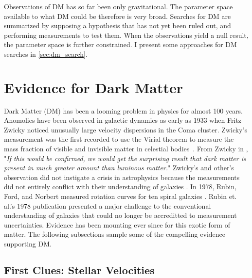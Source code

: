 Observations of DM has so far been only gravitational.
The parameter space available to what DM could be therefore is very broad.
Searches for DM are summarized by supposing a hypothesis that has not yet been ruled out, and performing measurements to test them.
When the observations yield a null result, the parameter space is further constrained.
I present some approaches for DM searches in \cref{sec:dm_search}.

\section{Evidence for Dark Matter}\label{sec:evidence4dm}

Dark Matter (DM) has been a looming problem in physics for almost 100 years.
Anomolies have been observed in galactic dynamics as early as 1933 when Fritz Zwicky noticed unusually large velocity dispersions in the Coma cluster.
Zwicky's measurement was the first recorded to use the Virial theorem to measure the mass fraction of visible and invisible matter in celestial bodies~\cite{Hooper:DMHistory}.
From Zwicky in \cite{Zwicky:1933}, "\textit{If this would be confirmed, we would get the surprising result that dark matter is present in much greater amount than luminous matter.}"
Zwicky's and other's observation did not instigate a crisis in astrophysics because the measurements did not entirely conflict with their understanding of galaxies \cite{Hooper:DMHistory}.
In 1978, Rubin, Ford, and Norbert measured rotation curves for ten spiral galaxies \cite{Rubin:1978}.
Rubin et. al.'s 1978 publication presented a major challenge to the conventional understanding of galaxies that could no longer be accreditted to measurement uncertainties.
Evidence has been mounting ever since for this exotic form of matter.
The following subsections sample some of the compelling evidence supporting DM.

\subsection{First Clues: Stellar Velocities\label{sec:ev4dm_stars}}


